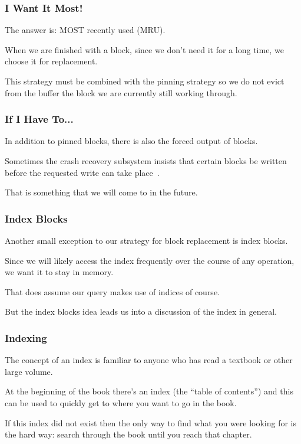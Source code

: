 \begin{frame}
\frametitle{I Want It Most!}
The answer is: MOST recently used (MRU). 

When we are finished with a block, since we don't need it for a long time, we choose it for replacement.

This strategy must be combined with the pinning strategy so we do not evict from the buffer the block we are currently still working through.

\end{frame}


\begin{frame}
\frametitle{If I Have To...}

In addition to pinned blocks, there is also the forced output of blocks. 

Sometimes the crash recovery subsystem insists that certain blocks be written before the requested write can take place~.

That is something that we will come to in the future. 

\end{frame}

\begin{frame}
\frametitle{Index Blocks}

Another small exception to our strategy for block replacement is index blocks. 

Since we will likely access the index frequently over the course of any operation, we want it to stay in memory. 

That does assume our query makes use of indices of course. 

But the index blocks idea leads us into a discussion of the index in general.

\end{frame}

\begin{frame}
\frametitle{Indexing}

The concept of an index is familiar to anyone who has read a textbook or other large volume. 

At the beginning of the book there's an index (the ``table of contents'') and this can be used to quickly get to where you want to go in the book. 

 If this index did not exist then the only way to find what you were looking for is the hard way: search through the book until you reach that chapter.

\end{frame}


